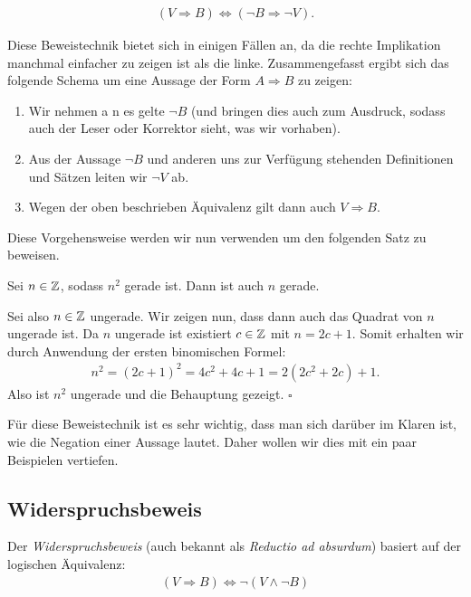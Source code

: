 \begin{align}
    (V \Rightarrow B) \iff (\neg B \Rightarrow \neg V).
\end{align}

Diese Beweistechnik bietet sich in einigen Fällen an, da die rechte Implikation
manchmal einfacher zu zeigen ist als die linke.
Zusammengefasst ergibt sich das folgende Schema um eine Aussage der Form
$A \Rightarrow B$ zu zeigen:
\begin{enumerate}
    \item
    Wir nehmen a n es gelte $\neg B$ (und bringen dies auch zum Ausdruck, sodass auch der Leser oder Korrektor sieht, was wir vorhaben).
    \item
    Aus der Aussage $\neg B$ und anderen uns zur Verfügung stehenden Definitionen und Sätzen leiten wir $\neg V$ ab.
    \item
    Wegen der oben beschrieben Äquivalenz gilt dann auch $V \Rightarrow B$.
\end{enumerate}

Diese Vorgehensweise werden wir nun verwenden um den folgenden Satz zu beweisen.

\begin{theorem}
Sei $n \in \mathbb{Z}$, sodass $n^2$ gerade ist.
Dann ist auch $n$ gerade.
\end{theorem}

\begin{proof*}
Sei also $n \in \mathbb{Z}$ ungerade. Wir zeigen nun, dass dann auch das Quadrat
von $n$ ungerade ist.
Da $n$ ungerade ist existiert $c \in \mathbb{Z}$ mit $n = 2c + 1$.
Somit erhalten wir durch Anwendung der ersten binomischen Formel:
\begin{align*}
    n^2 = (2c +1)^2 = 4c^2 + 4c + 1 = 2(2c^2+2c) + 1 .
\end{align*}
Also ist $n^2$ ungerade und die Behauptung gezeigt.
\hfill $\square$
\end{proof*}

Für diese Beweistechnik ist es sehr wichtig, dass man sich darüber im Klaren
ist, wie die Negation einer Aussage lautet.
Daher wollen wir dies mit ein paar Beispielen vertiefen.


\subsection{Widerspruchsbeweis} %

Der \textit{Widerspruchsbeweis} (auch bekannt als \textit{Reductio ad absurdum})
basiert auf der logischen Äquivalenz:
\begin{align*}
(V \Rightarrow B) \iff \neg (V \wedge \neg B)
\end{align*}

